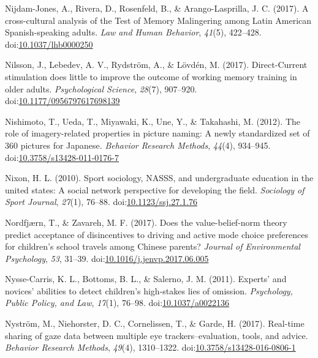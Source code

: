 \documentclass[english,man]{apa6}
\theoremstyle{definition}
\theoremstyle{definition}
\theoremstyle{definition}
\theoremstyle{remark}
\begin{document}
\hypertarget{ref-Nijdam-Jones2017}{}
Nijdam-Jones, A., Rivera, D., Rosenfeld, B., \& Arango-Lasprilla, J. C.
(2017). A cross-cultural analysis of the Test of Memory Malingering
among Latin American Spanish-speaking adults. \emph{Law and Human
Behavior}, \emph{41}(5), 422--428.
doi:\href{https://doi.org/10.1037/lhb0000250}{10.1037/lhb0000250}

\hypertarget{ref-Nilsson2017}{}
Nilsson, J., Lebedev, A. V., Rydström, A., \& Lövdén, M. (2017).
Direct-Current stimulation does little to improve the outcome of working
memory training in older adults. \emph{Psychological Science},
\emph{28}(7), 907--920.
doi:\href{https://doi.org/10.1177/0956797617698139}{10.1177/0956797617698139}

\hypertarget{ref-Nishimoto2012}{}
Nishimoto, T., Ueda, T., Miyawaki, K., Une, Y., \& Takahashi, M. (2012).
The role of imagery-related properties in picture naming: A newly
standardized set of 360 pictures for Japanese. \emph{Behavior Research
Methods}, \emph{44}(4), 934--945.
doi:\href{https://doi.org/10.3758/s13428-011-0176-7}{10.3758/s13428-011-0176-7}

\hypertarget{ref-Nixon2010}{}
Nixon, H. L. (2010). Sport sociology, NASSS, and undergraduate education
in the united states: A social network perspective for developing the
field. \emph{Sociology of Sport Journal}, \emph{27}(1), 76--88.
doi:\href{https://doi.org/10.1123/ssj.27.1.76}{10.1123/ssj.27.1.76}

\hypertarget{ref-Nordfjuxe6rn2017}{}
Nordfjærn, T., \& Zavareh, M. F. (2017). Does the value-belief-norm
theory predict acceptance of disincentives to driving and active mode
choice preferences for children's school travels among Chinese parents?
\emph{Journal of Environmental Psychology}, \emph{53}, 31--39.
doi:\href{https://doi.org/10.1016/j.jenvp.2017.06.005}{10.1016/j.jenvp.2017.06.005}

\hypertarget{ref-Nysse-Carris2011}{}
Nysse-Carris, K. L., Bottoms, B. L., \& Salerno, J. M. (2011). Experts'
and novices' abilities to detect children's high-stakes lies of
omission. \emph{Psychology, Public Policy, and Law}, \emph{17}(1),
76--98. doi:\href{https://doi.org/10.1037/a0022136}{10.1037/a0022136}

\hypertarget{ref-Nystrom2017}{}
Nyström, M., Niehorster, D. C., Cornelissen, T., \& Garde, H. (2017).
Real-time sharing of gaze data between multiple eye
trackers--evaluation, tools, and advice. \emph{Behavior Research
Methods}, \emph{49}(4), 1310--1322.
doi:\href{https://doi.org/10.3758/s13428-016-0806-1}{10.3758/s13428-016-0806-1}
\end{document}
